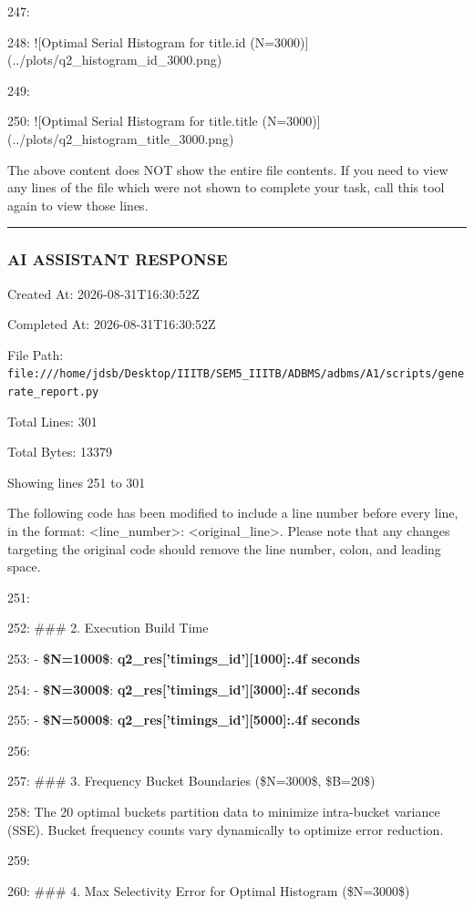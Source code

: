 \documentclass[11pt,a4paper]{article}
\begin{document}
247:

248: ![Optimal Serial Histogram for title.id (N=3000)](../plots/q2\_histogram\_id\_3000.png)

249:

250: ![Optimal Serial Histogram for title.title (N=3000)](../plots/q2\_histogram\_title\_3000.png)

The above content does NOT show the entire file contents. If you need to view any lines of the file which were not shown to complete your task, call this tool again to view those lines.


\hrule

\subsubsection{AI ASSISTANT RESPONSE}

Created At: 2026-08-31T16:30:52Z

Completed At: 2026-08-31T16:30:52Z

File Path: \texttt{file:///home/jdsb/Desktop/IIITB/SEM5\_IIITB/ADBMS/adbms/A1/scripts/generate\_report.py}

Total Lines: 301

Total Bytes: 13379

Showing lines 251 to 301

The following code has been modified to include a line number before every line, in the format: <line\_number>: <original\_line>. Please note that any changes targeting the original code should remove the line number, colon, and leading space.

251:

252: \#\#\# 2. Execution Build Time

253: - \textbf{\$N=1000\$}: \textbf{{q2\_res['timings\_id'][1000]:.4f} seconds}

254: - \textbf{\$N=3000\$}: \textbf{{q2\_res['timings\_id'][3000]:.4f} seconds}

255: - \textbf{\$N=5000\$}: \textbf{{q2\_res['timings\_id'][5000]:.4f} seconds}

256:

257: \#\#\# 3. Frequency Bucket Boundaries (\$N=3000\$, \$B=20\$)

258: The 20 optimal buckets partition data to minimize intra-bucket variance (SSE). Bucket frequency counts vary dynamically to optimize error reduction.

259:

260: \#\#\# 4. Max Selectivity Error for Optimal Histogram (\$N=3000\$)
\end{document}
